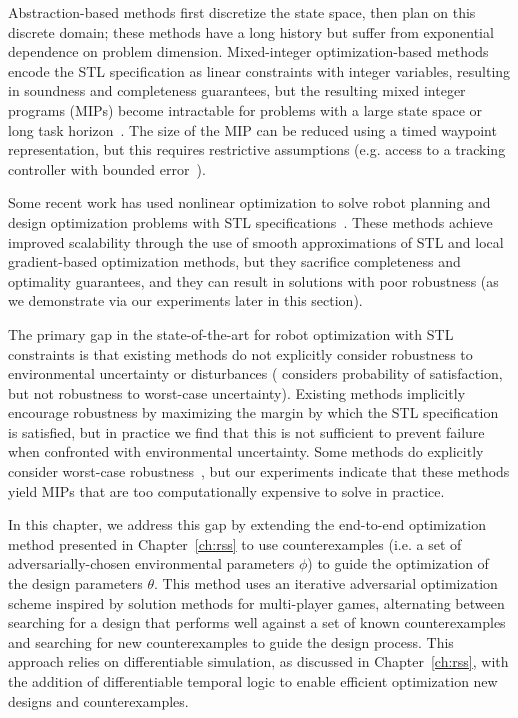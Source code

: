 Abstraction-based methods first discretize the state space, then plan on this discrete domain; these methods have a long history but suffer from exponential dependence on problem dimension. Mixed-integer optimization-based methods encode the STL specification as linear constraints with integer variables, resulting in soundness and completeness guarantees, but the resulting mixed integer programs (MIPs) become intractable for problems with a large state space or long task horizon~\cite{sadraddiniRobustTemporalLogic2016,yangSynthesisguidedAdversarialScenario2021,raman15}. The size of the MIP can be reduced using a timed waypoint representation, but this requires restrictive assumptions (e.g. access to a tracking controller with bounded error~\cite{sunMultiagentMotionPlanning2022}).

Some recent work has used nonlinear optimization to solve robot planning and design optimization problems with STL specifications~\cite{pantSmoothOperatorControl2017,pantazidesSatelliteMissionPlanning2022,leungBackPropagationSignalTemporal2021,takanoContinuousOptimizationBasedTask2021,leeSignalTemporalLogic2021}. These methods achieve improved scalability through the use of smooth approximations of STL and local gradient-based optimization methods, but they sacrifice completeness and optimality guarantees, and they can result in solutions with poor robustness (as we demonstrate via our experiments later in this section).

The primary gap in the state-of-the-art for robot optimization with STL constraints is that existing methods do not explicitly consider robustness to environmental uncertainty or disturbances (\cite{leeSignalTemporalLogic2021} considers probability of satisfaction, but not robustness to worst-case uncertainty). Existing methods implicitly encourage robustness by maximizing the margin by which the STL specification is satisfied, but in practice we find that this is not sufficient to prevent failure when confronted with environmental uncertainty. Some methods do explicitly consider worst-case robustness~\cite{raman15}, but our experiments indicate that these methods yield MIPs that are too computationally expensive to solve in practice.

In this chapter, we address this gap by extending the end-to-end optimization method presented in Chapter~\ref{ch:rss} to use counterexamples (i.e. a set of adversarially-chosen environmental parameters $\phi$) to guide the optimization of the design parameters $\theta$. This method uses an iterative adversarial optimization scheme inspired by solution methods for multi-player games, alternating between searching for a design that performs well against a set of known counterexamples and searching for new counterexamples to guide the design process. This approach relies on differentiable simulation, as discussed in Chapter~\ref{ch:rss}, with the addition of differentiable temporal logic to enable efficient optimization new designs and counterexamples.

